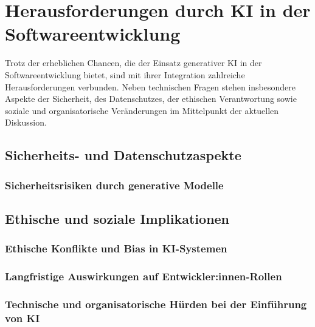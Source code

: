 \chapter{Herausforderungen durch KI in der Softwareentwicklung}
Trotz der erheblichen Chancen, die der Einsatz generativer KI in der
Softwareentwicklung bietet, sind mit ihrer Integration zahlreiche
Herausforderungen verbunden. Neben technischen Fragen stehen insbesondere
Aspekte der Sicherheit, des Datenschutzes, der ethischen Verantwortung sowie
soziale und organisatorische Veränderungen im Mittelpunkt der aktuellen
Diskussion.


\section{Sicherheits- und Datenschutzaspekte}


\subsection{Sicherheitsrisiken durch generative Modelle}


\section{Ethische und soziale Implikationen}


\subsection{Ethische Konflikte und Bias in KI-Systemen}


\subsection{Langfristige Auswirkungen auf Entwickler:innen-Rollen}


\subsection{Technische und organisatorische Hürden bei der Einführung von KI}


